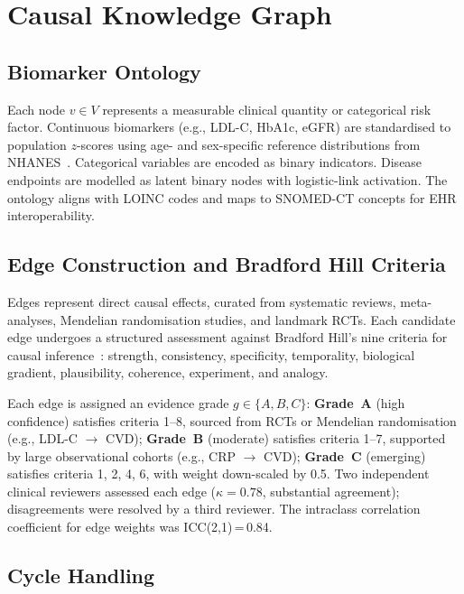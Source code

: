 \documentclass[runningheads]{llncs}
\begin{document}
\section{Causal Knowledge Graph}\label{sec:kg}

\subsection{Biomarker Ontology}\label{sec:ontology}

Each node $v \in V$ represents a measurable clinical quantity or
categorical risk factor.  Continuous biomarkers (e.g., LDL-C, HbA1c,
eGFR) are standardised to population $z$-scores using age- and
sex-specific reference distributions from NHANES~\cite{nhanes2020}.
Categorical variables are encoded as binary indicators.  Disease
endpoints are modelled as latent binary nodes with logistic-link
activation.  The ontology aligns with LOINC codes and maps to
SNOMED-CT concepts for EHR interoperability.

\subsection{Edge Construction and Bradford Hill Criteria}
\label{sec:edges}

Edges represent direct causal effects, curated from systematic
reviews, meta-analyses, Mendelian randomisation studies, and landmark
RCTs.  Each candidate edge undergoes a structured assessment against
Bradford Hill's nine criteria for causal
inference~\cite{hill1965environment}: strength, consistency,
specificity, temporality, biological gradient, plausibility,
coherence, experiment, and analogy.

Each edge is assigned an evidence grade $g \in \{A, B, C\}$:
\textbf{Grade~A} (high confidence) satisfies criteria 1--8, sourced
from RCTs or Mendelian randomisation (e.g., LDL-C $\rightarrow$ CVD);
\textbf{Grade~B} (moderate) satisfies criteria 1--7, supported by
large observational cohorts (e.g., CRP $\rightarrow$ CVD);
\textbf{Grade~C} (emerging) satisfies criteria 1, 2, 4, 6, with
weight down-scaled by 0.5.  Two independent clinical reviewers
assessed each edge ($\kappa = 0.78$, substantial agreement);
disagreements were resolved by a third reviewer.  The intraclass
correlation coefficient for edge weights was ICC(2,1)\,=\,0.84.

\subsection{Cycle Handling}\label{sec:cycles}
\end{document}
